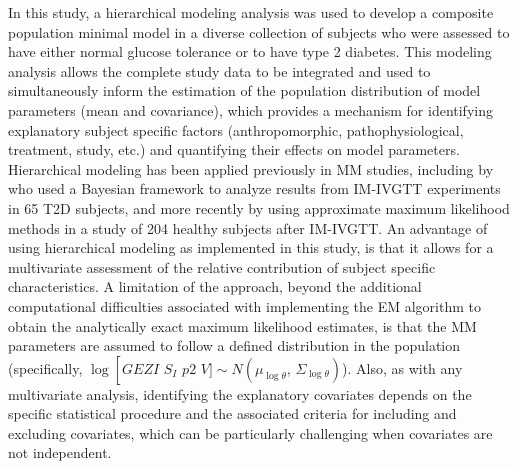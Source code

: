 \documentclass[utf8]{frontiersSCNS} %
\begin{document}
In this study, a hierarchical modeling analysis was used to develop a composite population minimal model in a diverse collection of subjects who were assessed to have either normal glucose tolerance or to have type 2 diabetes. This modeling analysis allows the complete study data to be integrated and used to simultaneously inform the estimation of the population distribution of model parameters (mean and covariance), which provides a mechanism for identifying explanatory subject specific factors (anthropomorphic, pathophysiological, treatment, study, etc.) and quantifying their effects on model parameters. Hierarchical modeling has been applied previously in MM studies, including by \citet{agbaje_2003} who used a Bayesian framework to analyze results from IM-IVGTT experiments in 65 T2D subjects, and more recently by \citet{Denti2010} using approximate maximum likelihood methods in a study of 204 healthy subjects after IM-IVGTT. An advantage of using hierarchical modeling as implemented in this study, is that it allows for a multivariate assessment of the relative contribution of subject specific characteristics. A limitation of the approach, beyond the additional computational difficulties associated with implementing the EM algorithm to obtain the analytically exact maximum likelihood estimates, is that the MM parameters are assumed to follow a defined distribution in the population (specifically, $\log \left[ GEZI\,\,{S_I}\,\,p2\,\,V] \sim N\left( {\mu_{\log \theta }},\,{\Sigma_{\log \theta}} \right)$). Also, as with any multivariate analysis, identifying the explanatory covariates depends on the specific statistical procedure and the associated criteria for including and excluding covariates, which can be particularly challenging when covariates are not independent.
\end{document}
